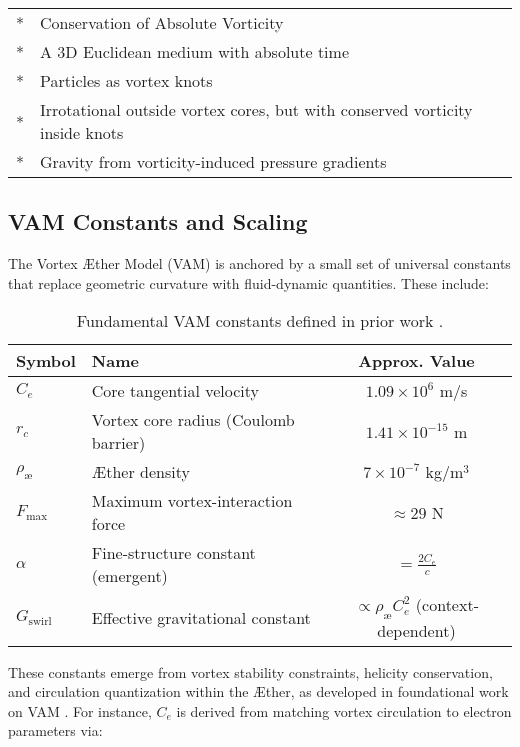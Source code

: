 \documentclass[aps,preprint,superscriptaddress]{revtex4}
\begin{document}
\begin{tabular}{ll}
    \toprule
    \midrule
        * & Conservation of Absolute Vorticity \\
        * & A 3D Euclidean medium with absolute time \\
        * & Particles as vortex knots \\
        * & Irrotational outside vortex cores, but with conserved vorticity inside knots \\
        * & Gravity from vorticity-induced pressure gradients \\
    \bottomrule
\end{tabular}

\subsection*{VAM Constants and Scaling}

The Vortex Æther Model (VAM) is anchored by a small set of universal constants that replace geometric curvature with fluid-dynamic quantities. These include:

\begin{table}[h!]
    \centering
    \begin{tabular}{llc}
        \hline
        \textbf{Symbol} & \textbf{Name} & \textbf{Approx. Value} \\
        \hline
        $C_e$ & Core tangential velocity & $1.09 \times 10^6$ m/s \\
        $r_c$ & Vortex core radius (Coulomb barrier) & $1.41 \times 10^{-15}$ m \\
        $\rho_{\text{\ae}}$ & Æther density & $7 \times 10^{-7}$ kg/m$^3$ \\
        $F_{\text{max}}$ & Maximum vortex-interaction force & $\approx 29$ N \\
        $\alpha$ & Fine-structure constant (emergent) & $= \frac{2 C_e}{c}$ \\
        $G_{\text{swirl}}$ & Effective gravitational constant & $ \propto \rho_{\text{\ae}} C_e^2$ (context-dependent) \\
        \hline
    \end{tabular}
    \caption{Fundamental VAM constants defined in prior work \cite{vam2025field, vam2025unified}.}
\end{table}

These constants emerge from vortex stability constraints, helicity conservation, and circulation quantization within the Æther, as developed in foundational work on VAM \cite{vam2025field, vam2025unified}. For instance, $C_e$ is derived from matching vortex circulation to electron parameters via:
\end{document}
